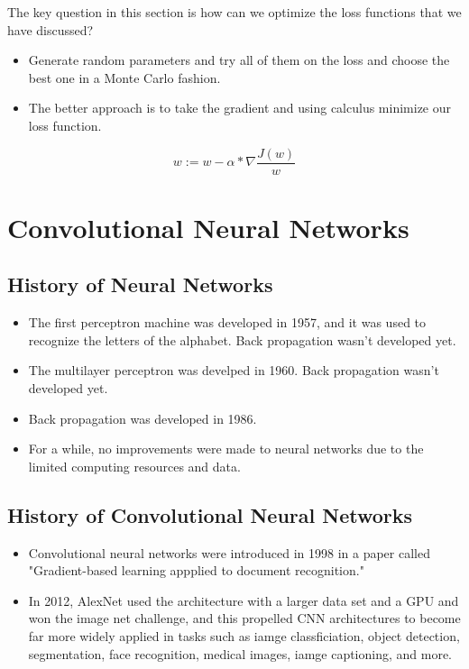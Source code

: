 \documentclass[12pt]{scrartcl}
\begin{document}
The key question in this section is how can we optimize the loss functions 
that we have discussed?
\begin{itemize}
  \item Generate random parameters and try all of them on the loss and choose
the best one in a Monte Carlo fashion.
  \item The better approach is to take the gradient and using calculus minimize 
our loss function.
\end{itemize}

\[w := w - \alpha * \nabla \frac{J(w)}{w}\]

\section{Convolutional Neural Networks}

\subsection{History of Neural Networks}
\begin{itemize}
  \item The first perceptron machine was developed in 1957, and it was used to recognize
the letters of the alphabet. Back propagation wasn't developed yet.
  \item The multilayer perceptron was develped in 1960. Back propagation wasn't developed yet.
  \item Back propagation was developed in 1986.
  \item For a while, no improvements were made to neural networks due to the 
  limited computing resources and data.
\end{itemize}

\subsection{History of Convolutional Neural Networks}

\begin{itemize}
  \item Convolutional neural networks were introduced in 1998 in a paper called 
  "Gradient-based learning appplied to document recognition."
  \item In 2012, AlexNet used the architecture with a larger data set and a GPU 
and won the image net challenge, and this propelled CNN architectures to become 
far more widely applied in tasks such as iamge classficiation, object detection, 
segmentation, face recognition, medical images, iamge captioning, and more.
\end{itemize}
\end{document}
